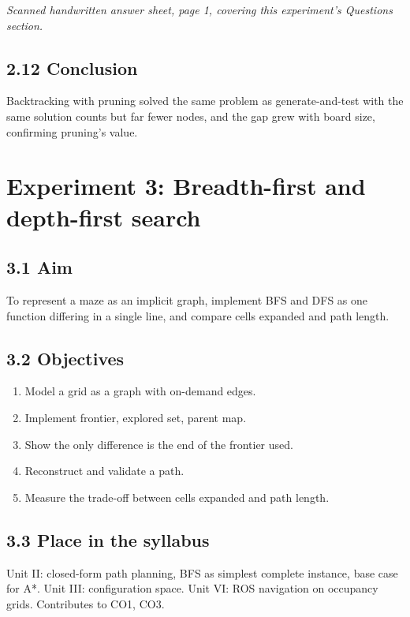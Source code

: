 \documentclass[
]{article}
\providecommand{\tightlist}{%
  \setlength{\itemsep}{0pt}\setlength{\parskip}{0pt}}
\begin{document}
\emph{Scanned handwritten answer sheet, page 1, covering this
experiment's Questions section.}

\subsection{2.12 Conclusion}\label{conclusion-1}

Backtracking with pruning solved the same problem as generate-and-test
with the same solution counts but far fewer nodes, and the gap grew with
board size, confirming pruning's value.

\section{Experiment 3: Breadth-first and depth-first
search}\label{experiment-3-breadth-first-and-depth-first-search}

\subsection{3.1 Aim}\label{aim-2}

To represent a maze as an implicit graph, implement BFS and DFS as one
function differing in a single line, and compare cells expanded and path
length.

\subsection{3.2 Objectives}\label{objectives-2}

\begin{enumerate}
\def\labelenumi{\arabic{enumi}.}
\tightlist
\item
  Model a grid as a graph with on-demand edges.
\item
  Implement frontier, explored set, parent map.
\item
  Show the only difference is the end of the frontier used.
\item
  Reconstruct and validate a path.
\item
  Measure the trade-off between cells expanded and path length.
\end{enumerate}

\subsection{3.3 Place in the syllabus}\label{place-in-the-syllabus-2}

Unit II: closed-form path planning, BFS as simplest complete instance,
base case for A*. Unit III: configuration space. Unit VI: ROS navigation
on occupancy grids. Contributes to CO1, CO3.
\end{document}
